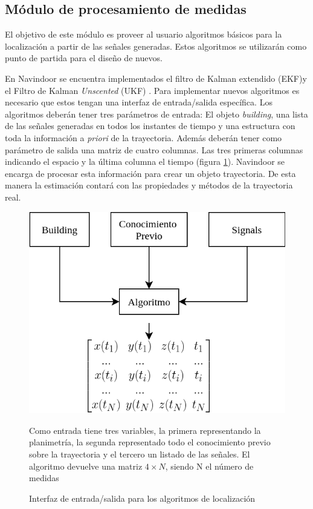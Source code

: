 \subsection{Módulo de procesamiento de medidas}
El objetivo de este módulo es proveer al usuario algoritmos básicos para la localización a partir de las señales generadas. Estos algoritmos se utilizarán como punto de partida para el diseño de nuevos. 

En Navindoor se encuentra implementados  el filtro de Kalman extendido (EKF)y el Filtro de Kalman \emph{Unscented} (UKF) . Para implementar nuevos algoritmos es necesario que estos tengan una interfaz de entrada/salida específica. Los algoritmos deberán tener tres parámetros de entrada: El objeto \emph{building}, una lista de las señales generadas en todos los instantes de tiempo y una estructura con toda la información a \emph{priori} de la trayectoria. Además deberán tener como parámetro de salida una matriz de cuatro columnas. Las tres primeras columnas indicando el espacio y la última columna el tiempo (figura \ref{format}). Navindoor se encarga de procesar esta información para crear un objeto trayectoria. De esta manera la estimación contará con las propiedades y métodos de la trayectoria real.  
\begin{figure}[ht!]
    \centering
        \includegraphics[width=0.725\columnwidth]{img/Design/InterfazAlgo.png}
        \caption{Interfaz de entrada/salida para los algoritmos de localización}
        \small
        Como entrada tiene tres variables, la primera representando la planimetría, la segunda representado todo el conocimiento previo sobre la trayectoria y el tercero un listado de las señales. El algoritmo devuelve una matriz $4 \times N$, siendo N el número de medidas
        \label{format}
    \end{figure}


